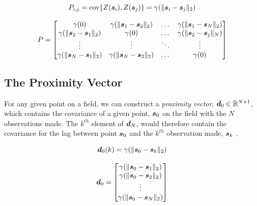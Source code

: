 \begin{equation}
    P_{i,j} = \text{cov}\{Z({\it{\boldsymbol{s}}}_{i}), Z({\it{\boldsymbol{s}}}_{j})\} = \gamma(\| {\it{\boldsymbol{s}}}_i - {\it{\boldsymbol{s}}}_j \|_2)
    \label{eq:covvarmatelem}
\end{equation}

\begin{equation}
    P = \begin{bmatrix} 

    \gamma(0) & \gamma(\| {\it{\boldsymbol{s}}}_1 - {\it{\boldsymbol{s}}}_2 \|_2) & \dots & \gamma(\| {\it{\boldsymbol{s}}}_1 - {\it{\boldsymbol{s}}}_N \|_2)\\
    
    \gamma(\| {\it{\boldsymbol{s}}}_2 - {\it{\boldsymbol{s}}}_1 \|_2) & \gamma(0) & \dots & \gamma(\| {\it{\boldsymbol{s}}}_2 - {\it{\boldsymbol{s}}}_j \|_N)\\

    \vdots & \vdots & \ddots & \vdots \\
    
    \gamma(\| {\it{\boldsymbol{s}}}_N - {\it{\boldsymbol{s}}}_1 \|_2) & \gamma(\| {\it{\boldsymbol{s}}}_N - {\it{\boldsymbol{s}}}_2 \|_2) & \dots & \gamma(0)\\

    \end{bmatrix}
    \label{eq:covvarmat}
\end{equation}

\subsection{The Proximity Vector} \label{sec:proxvect}
For any given point on a field, we can construct a \textit{proximity vector}, ${\it{\boldsymbol{d}}}_0 \in \mathbb{R}^{N+1}$, which contains the covariance of a given point, ${\it{\boldsymbol{s}}}_0$ on the field with the $N$ observations made. The $k^{th}$ element of ${\it{\boldsymbol{d}}}_N$, would therefore contain the covariance for the lag between point ${\it{\boldsymbol{s}}}_0$ and the $k^{th}$ observation made, ${\it{\boldsymbol{s}}}_k$ \cite{matheron:geostat}.

$${\it{\boldsymbol{d}}}_0(k) = \gamma(\| {\it{\boldsymbol{s}}}_0 - {\it{\boldsymbol{s}}}_k \|_2)$$

\begin{equation}
    {\it{\boldsymbol{d}}}_0 =
        \begin{bmatrix} 
                    \gamma(\| {\it{\boldsymbol{s}}}_0 - {\it{\boldsymbol{s}}}_1 \|_2) \\
                    \gamma(\| {\it{\boldsymbol{s}}}_0 - {\it{\boldsymbol{s}}}_2 \|_2) \\
                     \vdots \\
                    \gamma(\| {\it{\boldsymbol{s}}}_0 - {\it{\boldsymbol{s}}}_N \|_2) \\
        \end{bmatrix} 
    \label{eq:proxvect}
\end{equation}

